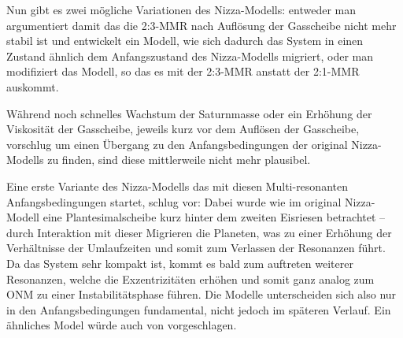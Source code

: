 \documentclass[12pt,a4paper,twoside]{article}
\begin{document}
Nun gibt es zwei mögliche Variationen des Nizza-Modells: entweder man argumentiert damit das die 2:3-MMR nach Auflösung der Gasscheibe nicht mehr stabil ist und entwickelt ein Modell, wie sich dadurch das System in einen Zustand ähnlich dem Anfangszustand des Nizza-Modells migriert, oder man modifiziert das Modell, so das es mit der  2:3-MMR anstatt der 2:1-MMR auskommt. %

Während \cite{Morbidelli2007a} noch schnelles Wachstum der Saturnmasse oder ein Erhöhung der Viskosität der Gasscheibe, jeweils kurz vor dem Auflösen der Gasscheibe, vorschlug um einen Übergang zu den Anfangsbedingungen der original Nizza-Modells zu finden, sind diese mittlerweile nicht mehr plausibel. %

Eine erste Variante des Nizza-Modells das mit diesen Multi-resonanten Anfangsbedingungen startet, schlug \cite{Morbidelli2007b} vor:
Dabei wurde wie im original Nizza-Modell eine Plantesimalscheibe kurz hinter dem zweiten Eisriesen betrachtet -- durch Interaktion mit dieser Migrieren die Planeten, was zu einer Erhöhung der Verhältnisse der Umlaufzeiten und somit zum Verlassen der Resonanzen führt.
Da das System sehr kompakt ist, kommt es bald zum auftreten weiterer Resonanzen, welche die Exzentrizitäten erhöhen und somit ganz analog zum ONM zu einer Instabilitätsphase führen. Die Modelle unterscheiden sich also nur in den Anfangsbedingungen fundamental, nicht jedoch im späteren Verlauf.
Ein ähnliches Model würde auch von \cite{Batygin2010} vorgeschlagen.
\end{document}
